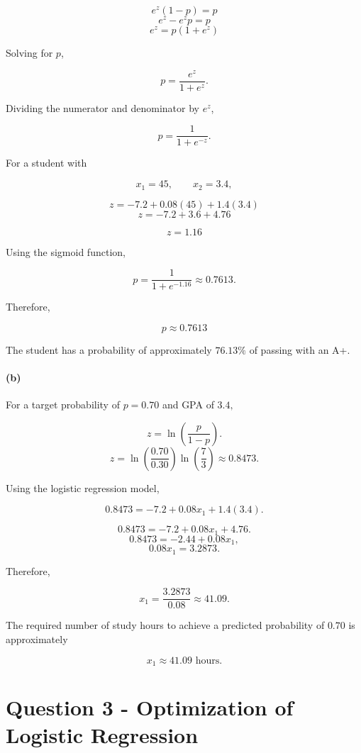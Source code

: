 \documentclass[11pt]{article}
\begin{document}
\[
e^z(1-p)=p
\] \[
e^z-e^zp=p
\] \[
e^z=p(1+e^z)
\]

Solving for \(p\),

\[
p=\frac{e^z}{1+e^z}.
\]

Dividing the numerator and denominator by \(e^z\),

\[
\boxed{
p=\frac{1}{1+e^{-z}}
}.
\]

For a student with

\[
x_1=45,
\qquad
x_2=3.4,
\]

\[
z
= -7.2+0.08(45)+1.4(3.4)
\] \[
z
= -7.2+3.6+4.76
\]

\[z = 1.16\]

Using the sigmoid function,

\[
p
=
\frac{1}{1+e^{-1.16}}
\approx 0.7613.
\]

Therefore,

\[
\boxed{p\approx0.7613}
\]

The student has a probability of approximately \(76.13\%\) of passing
with an A+.

\paragraph{(b)}\label{b}

For a target probability of \(p=0.70\) and GPA of \(3.4,\)

\[
z
=
\ln\left(\frac{p}{1-p}\right).
\] \[
z
=
\ln\left(\frac{0.70}{0.30}\right)
\ln\left(\frac{7}{3}\right)
\approx0.8473.
\]

Using the logistic regression model,

\[
0.8473
=
-7.2+0.08x_1+1.4(3.4).
\]

\[
0.8473
=
-7.2+0.08x_1+4.76.
\] \[
0.8473=-2.44+0.08x_1,
\] \[
0.08x_1=3.2873.
\]

Therefore,

\[
x_1
=
\frac{3.2873}{0.08}
\approx41.09.
\]

The required number of study hours to achieve a predicted probability of
\(0.70\) is approximately

\[
\boxed{x_1\approx41.09\text{ hours}}.
\]

    \clearpage
    \section{Question 3 - Optimization of Logistic
Regression}\label{question-3---optimization-of-logistic-regression}
\end{document}
